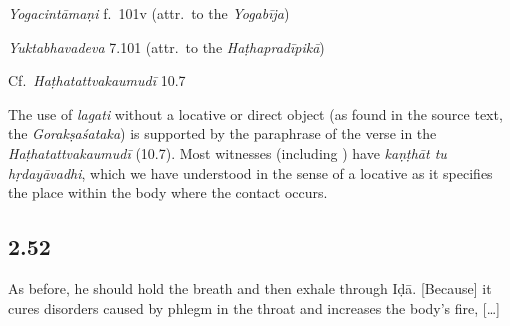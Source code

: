 \begin{ekdosis}
\begin{testimonia}[hp02_051]
\emph{Yogacintāmaṇi} f.~101v (attr.~to the \emph{Yogabīja})

\begin{versinnote}
\end{versinnote}

\emph{Yuktabhavadeva} 7.101 (attr.~to the \emph{Haṭhapradīpikā})

\begin{versinnote} 
\end{versinnote}

Cf.~\emph{Haṭhatattvakaumudī} 10.7
\begin{versinnote}
\end{versinnote}
\end{testimonia}

\begin{philcomm}[hp02_051]
The use of \emph{lagati} without a locative or direct object (as found in the source text, the \emph{Gorakṣaśataka}) is supported by the paraphrase of the verse in the \emph{Haṭhatattvakaumudī} (10.7). Most witnesses (including \textalpha) have \emph{kaṇṭhāt tu hṛdayāvadhi}, which we have understood in the sense of a locative as it specifies the place within the body where the contact occurs. 
\end{philcomm}

\subsection*{2.52}
\begin{translation}[hp02_052]
As before, he should hold the breath and then exhale through Iḍā. [Because] it cures disorders caused by phlegm in the throat and increases the body’s fire, [\dots]
\end{translation}


\end{ekdosis}
